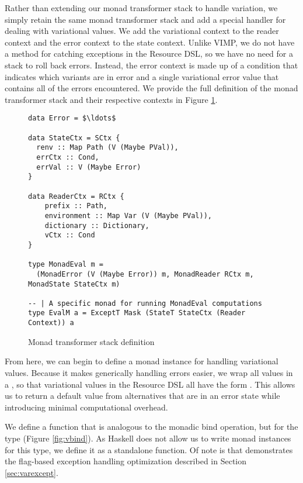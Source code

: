 \documentclass[12pt,oneside]{book}
\begin{document}
Rather than extending our monad transformer stack to handle variation, we simply retain the same monad transformer stack
and add a special handler for dealing with variational values. We add the variational context to the reader context and the error
context to the state context. Unlike VIMP, we do not have a method for catching exceptions in the Resource DSL, so we have
no need for a stack to roll back errors. Instead, the error context is made up of a condition that indicates which variants are in error
and a single variational error value that contains all of the errors encountered. We provide the full definition of the monad transformer
stack and their respective contexts in Figure \ref{fig:transstack}.

\begin{figure}
\begin{lstlisting}
data Error = $\ldots$

data StateCtx = SCtx {
  renv :: Map Path (V (Maybe PVal)),
  errCtx :: Cond,
  errVal :: V (Maybe Error)
}

data ReaderCtx = RCtx {
    prefix :: Path,
    environment :: Map Var (V (Maybe PVal)),
    dictionary :: Dictionary,
    vCtx :: Cond
}

type MonadEval m =
  (MonadError (V (Maybe Error)) m, MonadReader RCtx m, MonadState StateCtx m)

-- | A specific monad for running MonadEval computations
type EvalM a = ExceptT Mask (StateT StateCtx (Reader Context)) a
\end{lstlisting}
\caption{Monad transformer stack definition}
\label{fig:transstack}
\end{figure}

From here, we can begin to define a monad instance for handling variational values.
Because it makes generically handling errors easier, we wrap all values in a ,
so that variational values in the Resource DSL all have the form . This
allows us to return a default value from alternatives that are in an error state while introducing minimal
computational overhead.

We define a function  that is analogous to the monadic bind operation, but for
the type  (Figure \ref{fig:vbind}). As Haskell does not allow us to write monad instances for this
type, we define it as a standalone function. Of note is that  demonstrates the flag-based exception handling optimization
described in Section \ref{sec:varexcept}.
\end{document}
